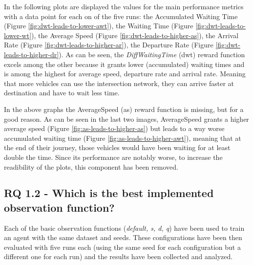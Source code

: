 In the following plots are displayed the values for the main performance metrics with a data point for each on of the five runs: the Accumulated Waiting Time (Figure \ref{fig:dwt-leads-to-lower-awt}), the Waiting Time (Figure \ref{fig:dwt-leads-to-lower-wt}), the Average Speed (Figure \ref{fig:dwt-leads-to-higher-as}), the Arrival Rate (Figure \ref{fig:dwt-leads-to-higher-ar}), the Departure Rate (Figure \ref{fig:dwt-leads-to-higher-dr}).
As can be seen, the \textit{DiffWaitingTime} (dwt) reward function excels among the other because it grants lower (accumulated) waiting times and is among the highest for average speed, departure rate and arrival rate.
Meaning that more vehicles can use the intersection network, they can arrive faster at destination and have to wait less time.


In the above graphs the AverageSpeed (as) reward function is missing, but for a good reason.
As can be seen in the last two images, AverageSpeed grants a higher average speed (Figure \ref{fig:as-leads-to-higher-as}) but leads to a way worse accumulated waiting time (Figure \ref{fig:as-leads-to-higher-awt}), meaning that at the end of their journey, those vehicles would have been waiting for at least double the time.
Since its performance are notably worse, to increase the readibility of the plots, this component has been removed.


\subsection{RQ 1.2 - Which is the best implemented observation function?}

Each of the basic observation functions (\textit{default, s, d, q}) have been used to train an agent with the same dataset and seeds. These configurations have been then evaluated with five runs each (using the same seed for each configuration but a different one for each run) and the results have been collected and analyzed.

